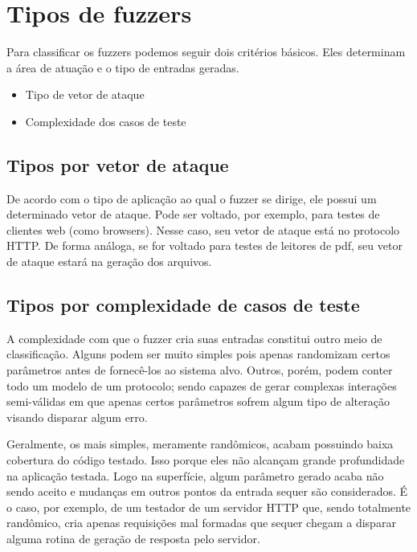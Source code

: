 	\section{Tipos de fuzzers}
		Para classificar os fuzzers podemos seguir dois critérios básicos.
		Eles determinam a área de atuação e o tipo de entradas geradas.
		\begin{itemize}
			\item{Tipo de vetor de ataque}
			\item{Complexidade dos casos de teste}
		\end{itemize}

		\subsection{Tipos por vetor de ataque}
			De acordo com o tipo de aplicação ao qual o fuzzer se dirige, ele possui
			um determinado vetor de ataque. Pode ser voltado, por exemplo,
			para testes de clientes web (como browsers). Nesse caso, seu vetor
			de ataque está no protocolo HTTP. De forma análoga, se for voltado para 
			testes de leitores de pdf, seu vetor de ataque estará na geração dos arquivos.
		
		\subsection{Tipos por complexidade de casos de teste}
			A complexidade com que o fuzzer cria suas entradas constitui outro meio
			de classificação.
			Alguns podem ser muito simples pois apenas randomizam certos parâmetros antes
			de fornecê-los ao sistema alvo. Outros, porém, podem conter todo um modelo
			de um protocolo; sendo capazes de gerar complexas interações semi-válidas
			em que apenas certos parâmetros sofrem algum tipo de alteração visando
			disparar algum erro. 


			Geralmente, os mais simples, meramente randômicos, acabam possuindo
			baixa cobertura do código testado. Isso porque eles não alcançam
			grande profundidade na aplicação testada. Logo na superfície, algum
			parâmetro gerado acaba não sendo aceito e mudanças em outros pontos
			da entrada sequer são considerados. É o caso, por exemplo,
			de um testador de um servidor HTTP que, sendo totalmente randômico,
			cria apenas requisições mal formadas que sequer chegam a disparar
			alguma rotina de geração de resposta pelo servidor.
			
